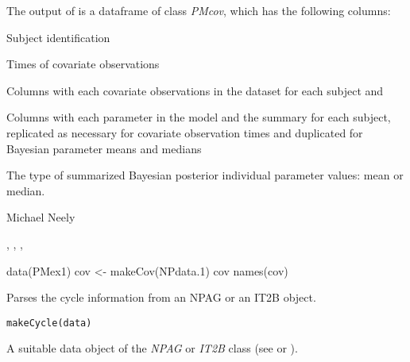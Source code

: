 \documentclass[a4paper]{book}
\begin{document}
%
\begin{Value}
The output of  is a dataframe of class \emph{PMcov},
which has the following columns:
\begin{ldescription}
\item[\code{id }] Subject identification
\item[\code{time }] Times of covariate observations
\item[\code{covnames... }] Columns with each covariate observations in the dataset for each subject and  
\item[\code{parnames... }] Columns with each parameter in the model and the  summary
for each subject, replicated as necessary for covariate observation times and duplicated for Bayesian 
parameter means and medians 
\item[\code{icen}] The type of summarized Bayesian posterior individual parameter values: mean or median.
\end{ldescription}
\end{Value}
%
\begin{Author}\relax
Michael Neely
\end{Author}
%
\begin{SeeAlso}\relax
{}, , , 
\end{SeeAlso}
%
\begin{Examples}
\begin{ExampleCode}
data(PMex1)
cov <- makeCov(NPdata.1)
cov
names(cov)
\end{ExampleCode}
\end{Examples}
%
\begin{Description}\relax
Parses the cycle information from an NPAG or an IT2B object.
\end{Description}
%
\begin{Usage}
\begin{verbatim}
makeCycle(data)
\end{verbatim}
\end{Usage}
%
\begin{Arguments}
\begin{ldescription}
\item[\code{data}] A suitable data object of the \emph{NPAG} or \emph{IT2B} class (see  or ).
\end{ldescription}
\end{Arguments}
\end{document}
